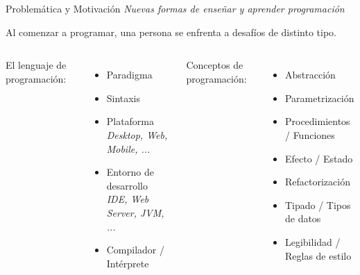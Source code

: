 \documentclass{beamer}
\begin{document}
\begin{frame}[plain]
    \titlepage
\end{frame}


\begin{frame}
    {Problemática y Motivación}
    {\emph{Nuevas formas de enseñar y aprender programación}}

    Al comenzar a programar, una persona se enfrenta a
    desafíos de distinto tipo.

    \vspace{1.5em}

    \begin{columns}[t]
            El lenguaje de programación:
            \vspace{.5em}
            \begin{itemize}
                \item Paradigma
                \item Sintaxis
                \item Plataforma \\
                      {\footnotesize\emph{Desktop, Web, Mobile, ...}}
                \item Entorno de desarrollo \\
                      {\footnotesize\emph{IDE, Web Server, JVM, ...}}
                \item Compilador / Intérprete
            \end{itemize}

            Conceptos de programación:
            \vspace{.5em}
            \begin{itemize}
                \item Abstracción
                \item Parametrización
                \item Procedimientos / Funciones
                \item Efecto / Estado
                \item Refactorización
                \item Tipado / Tipos de datos
                \item Legibilidad / Reglas de estilo
            \end{itemize}

    \end{columns}

\end{frame}
\end{document}
